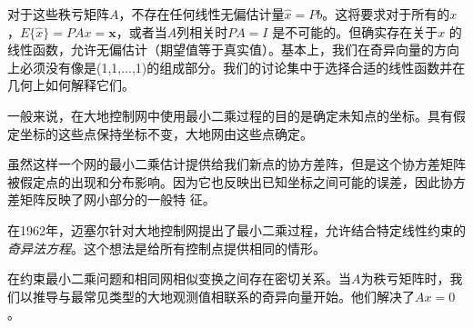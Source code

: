对于这些秩亏矩阵$A$，不存在任何线性无偏估计量$\hat{x} = Pb$。这将要求对于所有的$x$，$E\{\hat{x}\}= PAx = \mathbf{x}$，或者当$A$列相关时$PA = I$ 是不可能的。但确实存在关于$x$
的线性函数，允许无偏估计（期望值等于真实值）。基本上，我们在奇异向量的方向上必须没有像是(1,1,...,1)的组成部分。我们的讨论集中于选择合适的线性函数并在几何上如何解释它们。
\par
一般来说，在大地控制网中使用最小二乘过程的目的是确定未知点的坐标。具有假定坐标的这些点保持坐标不变，大地网由这些点确定。
\par
虽然这样一个网的最小二乘估计提供给我们新点的协方差阵，但是这个协方差矩阵被假定点的出现和分布影响。因为它也反映出已知坐标之间可能的误差，因此协方差矩阵反映了网小部分的一般特
征。
\par
在1962年，迈塞尔针对大地控制网提出了最小二乘过程，允许结合特定线性约束的\emph{奇异法方程}。这个想法是给所有控制点提供相同的情形。
\par
在约束最小二乘问题和相同网相似变换之间存在密切关系。当$A$为秩亏矩阵时，我们以推导与最常见类型的大地观测值相联系的奇异向量开始。他们解决了$Ax = 0$。	